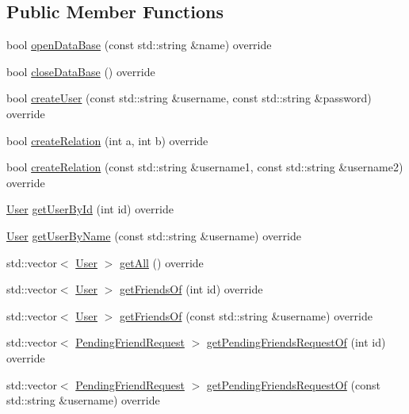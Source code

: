 \subsection*{Public Member Functions}
\begin{DoxyCompactItemize}
\item 
bool \mbox{\hyperlink{classSqliteProvider_ac37c4f4cb4438b309f7b57eda4579b79}{open\+Data\+Base}} (const std\+::string \&name) override
\item 
bool \mbox{\hyperlink{classSqliteProvider_a3f54f53f319d3c9b8c5bec57f2708c07}{close\+Data\+Base}} () override
\item 
bool \mbox{\hyperlink{classSqliteProvider_a7483b0b7156adba736b6b27f8b1826a0}{create\+User}} (const std\+::string \&username, const std\+::string \&password) override
\item 
bool \mbox{\hyperlink{classSqliteProvider_a6dc02301bf2f012306eeed7e867cec08}{create\+Relation}} (int a, int b) override
\item 
bool \mbox{\hyperlink{classSqliteProvider_a452f16560299d7e5f9c3f738cba13172}{create\+Relation}} (const std\+::string \&username1, const std\+::string \&username2) override
\item 
\mbox{\hyperlink{structUser}{User}} \mbox{\hyperlink{classSqliteProvider_a1e6db27d238aadcb5871c278521aea72}{get\+User\+By\+Id}} (int id) override
\item 
\mbox{\hyperlink{structUser}{User}} \mbox{\hyperlink{classSqliteProvider_a2654aee827789cfc1d40e9992d441056}{get\+User\+By\+Name}} (const std\+::string \&username) override
\item 
std\+::vector$<$ \mbox{\hyperlink{structUser}{User}} $>$ \mbox{\hyperlink{classSqliteProvider_a0b9c9b002caa7e43ed4590a6a1023525}{get\+All}} () override
\item 
std\+::vector$<$ \mbox{\hyperlink{structUser}{User}} $>$ \mbox{\hyperlink{classSqliteProvider_a639fb7f9341b668d17917711fc5ae39a}{get\+Friends\+Of}} (int id) override
\item 
std\+::vector$<$ \mbox{\hyperlink{structUser}{User}} $>$ \mbox{\hyperlink{classSqliteProvider_a19b97c70f002b84aa6a41d2d2dc9c44d}{get\+Friends\+Of}} (const std\+::string \&username) override
\item 
std\+::vector$<$ \mbox{\hyperlink{structPendingFriendRequest}{Pending\+Friend\+Request}} $>$ \mbox{\hyperlink{classSqliteProvider_a199db7e0313f5e485fcf67d5a9864233}{get\+Pending\+Friends\+Request\+Of}} (int id) override
\item 
std\+::vector$<$ \mbox{\hyperlink{structPendingFriendRequest}{Pending\+Friend\+Request}} $>$ \mbox{\hyperlink{classSqliteProvider_a82dcdc27e96ff8bfe63989af3e6eff62}{get\+Pending\+Friends\+Request\+Of}} (const std\+::string \&username) override

\end{DoxyCompactItemize}
